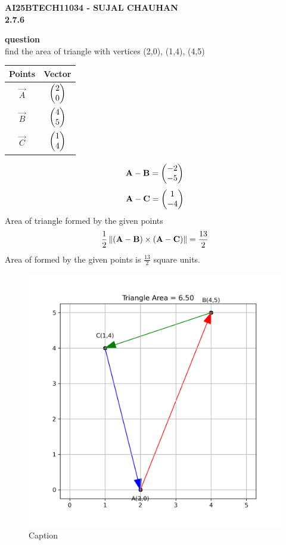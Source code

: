 \documentclass[12pt]{article}
\begin{document}
    



\newpage
\begin{center}
\textbf{\Large AI25BTECH11034 - SUJAL CHAUHAN }\\
\textbf {2.7.6}
\end{center}
\textbf{question}\\
find the area of triangle with vertices (2,0), (1,4), (4,5) 
\begin{center}
\begin{tabular}{|c|c|}
\hline
Points & Vector \\ \hline
$\Vec{A}$ & $\begin{pmatrix}2 \\ 0\end{pmatrix}$\\ \hline
$\Vec{B}$ & $\begin{pmatrix}4 \\ 5\end{pmatrix}$\\ \hline
$\Vec{C}$ & $\begin{pmatrix}1\\ 4\end{pmatrix}$\\ \hline

\end{tabular}
\end{center}

\begin{align}
    \mathbf{A}-\mathbf{B}=\begin{pmatrix}-2 \\ -5\end{pmatrix}
\end{align}
\begin{align}
    \mathbf{A}-\mathbf{C}=\begin{pmatrix}1\\-4\end{pmatrix}
\end{align}
Area of triangle formed by the given points
\begin{align}
    \frac{1}{2}\norm{(\Vec{A}-\Vec{B})\times(\Vec{A}-\Vec{C})}=\frac{13}{2}
\end{align}
Area of formed by the given points is $\frac{13}{2}$
 square units.
\newpage
\begin{figure}[h]
    \centering
    \includegraphics[width=0.5\linewidth]{figures/triangle.png}
    \caption{Caption}
    \label{fig:placeholder}
\end{figure}
\end{document}
